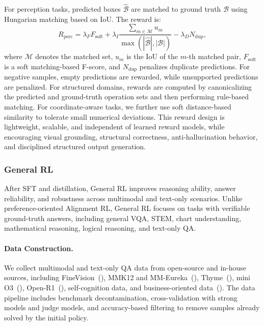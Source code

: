 \documentclass{llmxive}
\begin{document}
For perception tasks, predicted boxes $\hat{\mathcal{B}}$ are matched to ground truth $\mathcal{B}$ using Hungarian matching based on IoU. The reward is:
\begin{equation}
R_{\mathrm{perc}} =
\lambda_F F_{\mathrm{soft}} +
\lambda_I
\frac{\sum_{m \in \mathcal{M}} u_m}
{\max(|\hat{\mathcal{B}}|,|\mathcal{B}|)}
-
\lambda_D N_{\mathrm{dup}},
\end{equation}
where $\mathcal{M}$ denotes the matched set, $u_m$ is the IoU of the $m$-th matched pair, $F_{\mathrm{soft}}$ is a soft matching-based F-score, and $N_{\mathrm{dup}}$ penalizes duplicate predictions. For negative samples, empty predictions are rewarded, while unsupported predictions are penalized. For structured domains, rewards are computed by canonicalizing the predicted and ground-truth operation sets and then performing rule-based matching. For coordinate-aware tasks, we further use soft distance-based similarity to tolerate small numerical deviations. This reward design is lightweight, scalable, and independent of learned reward models, while encouraging visual grounding, structural correctness, anti-hallucination behavior, and disciplined structured output generation.

\subsubsection{General RL}

After SFT and distillation, General RL improves reasoning ability, answer reliability, and robustness across multimodal and text-only scenarios. Unlike preference-oriented Alignment RL, General RL focuses on tasks with verifiable ground-truth answers, including general VQA, STEM, chart understanding, mathematical reasoning, logical reasoning, and text-only QA.

\paragraph{Data Construction.}
We collect multimodal and text-only QA data from open-source and in-house sources, including FineVision~(\cite{finevision}), MMK12 and MM-Eureka~(\cite{mm_eureka}), Thyme~(\cite{thyme}), mini O3~(\cite{minio3}), Open-R1~(\cite{openr1}), self-cognition data, and business-oriented data~(\cite{kuaimod}). The data pipeline includes benchmark decontamination, cross-validation with strong models and judge models, and accuracy-based filtering to remove samples already solved by the initial policy.
\end{document}

